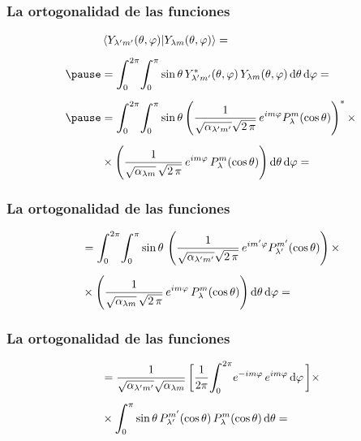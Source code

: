 \documentclass[12pt]{beamer}
\begin{document}
\begin{frame}
\frametitle{La ortogonalidad de las funciones}
\begin{eqnarray*}
\begin{aligned}
&\braket{Y_{\lambda^{\prime} m^{\prime}} (\theta, \varphi)}{Y_{\lambda m} (\theta, \varphi)} = \\[0.5em] \pause
&= \scaleint{6ex}_{\bs 0}^{2 \pi} \scaleint{6ex}_{\bs 0}^{\pi}  \sin \theta \, Y_{\lambda^{\prime} m^{\prime}}^{*} (\theta, \varphi) \, Y_{\lambda m} (\theta, \varphi) \dd{\theta} \dd{\varphi} = \\[0.5em] \pause
&= \scaleint{6ex}_{\bs 0}^{2 \pi} \scaleint{6ex}_{\bs 0}^{\pi}  \sin \theta \left( \dfrac{1}{\sqrt{\alpha_{\lambda^{\prime} m^{\prime}}} \sqrt{2 \, \pi}} \, e^{i  m \varphi} P_{\lambda}^{m} (\cos \theta) \right)^{*} \times \\[0.5em]
&\times \left( \dfrac{1}{\sqrt{\alpha_{\lambda m}} \, \sqrt{2 \, \pi}} \, e^{i m \varphi} \, P_{\lambda}^{m} (\cos \theta) \right) \dd{\theta} \dd{\varphi} =
\end{aligned}
\end{eqnarray*}
\end{frame}
\begin{frame}
\frametitle{La ortogonalidad de las funciones}
\begin{eqnarray*}
\begin{aligned}
&= \scaleint{6ex}_{\bs 0}^{2 \pi} \scaleint{6ex}_{\bs 0}^{\pi}  \sin \theta \, \left( \dfrac{1}{\sqrt{\alpha_{\lambda^{\prime} m^{\prime} } } \sqrt{2 \, \pi}} \, e^{i  m^{\prime} \varphi} P_{\lambda^{\prime}}^{m^{\prime}} (\cos \theta) \right) \times \\[0.5em]
&\times \left( \dfrac{1}{\sqrt{\alpha_{\lambda m}} \, \sqrt{2 \, \pi}} \, e^{i m \varphi} \, P_{\lambda}^{m} (\cos \theta) \right) \dd{\theta} \dd{\varphi} = 
\end{aligned}
\end{eqnarray*}
\end{frame}
\begin{frame}
\frametitle{La ortogonalidad de las funciones}
\begin{eqnarray*}
\begin{aligned}
&= \dfrac{1}{\sqrt{\alpha_{\lambda^{\prime} m^{\prime}}}  \sqrt{\alpha_{\lambda m}}} \, \bigg[ \dfrac{1}{2 \pi} \scaleint{6ex}_{\bs 0}^{2 \pi}  e^{-i m \varphi} \, e^{i m \varphi} \dd{\varphi} \bigg] \times \\[0.5em] 
&\times \scaleint{6ex}_{\bs 0}^{\pi} \sin \theta \, P_{\lambda^{\prime}}^{m^{\prime}} (\cos \theta) \, P_{\lambda}^{m} (\cos \theta) \dd{\theta} =
\end{aligned}
\end{eqnarray*}
\end{frame}
\end{document}
